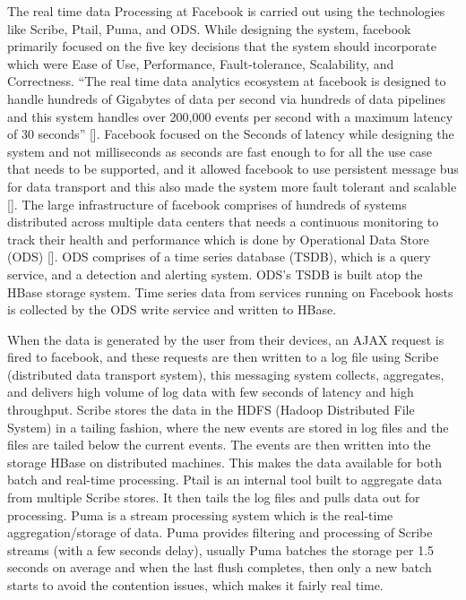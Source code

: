 The real time data Processing at Facebook is carried out using the
technologies like Scribe, Ptail, Puma, and ODS. While designing the
system, facebook primarily focused on the five key decisions that the
system should incorporate which were Ease of Use, Performance,
Fault-tolerance, Scalability, and Correctness. ``The real time data
analytics ecosystem at facebook is designed to handle hundreds of
Gigabytes of data per second via hundreds of data pipelines and this
system handles over 200,000 events per second with a maximum latency
of 30 seconds'' [\cite{www-facebook}]. Facebook focused on the Seconds
of latency while designing the system and not milliseconds as seconds
are fast enough to for all the use case that needs to be supported,
and it allowed facebook to use persistent message bus for data
transport and this also made the system more fault tolerant and
scalable [\cite{www-facebook}]. The large infrastructure of facebook
comprises of hundreds of systems distributed across multiple data
centers that needs a continuous monitoring to track their health and
performance which is done by Operational Data Store
(ODS) [\cite{facebook-paper-2016}]. ODS comprises of a time series
database (TSDB), which is a query service, and a detection and
alerting system. ODS's TSDB is built atop the HBase storage
system. Time series data from services running on Facebook hosts is
collected by the ODS write service and written to HBase.

When the data is generated by the user from their devices, an AJAX
request is fired to facebook, and these requests are then written to a
log file using Scribe (distributed data transport system), this
messaging system collects, aggregates, and delivers high volume of log
data with few seconds of latency and high throughput. Scribe stores
the data in the HDFS (Hadoop Distributed File System) in a tailing
fashion, where the new events are stored in log files and the files
are tailed below the current events. The events are then written into
the storage HBase on distributed machines. This makes the data
available for both batch and real-time processing. Ptail is an
internal tool built to aggregate data from multiple Scribe stores. It
then tails the log files and pulls data out for processing. Puma is a
stream processing system which is the real-time aggregation/storage of
data. Puma provides filtering and processing of Scribe streams (with a
few seconds delay), usually Puma batches the storage per 1.5 seconds
on average and when the last flush completes, then only a new batch
starts to avoid the contention issues, which makes it fairly real
time.
     
